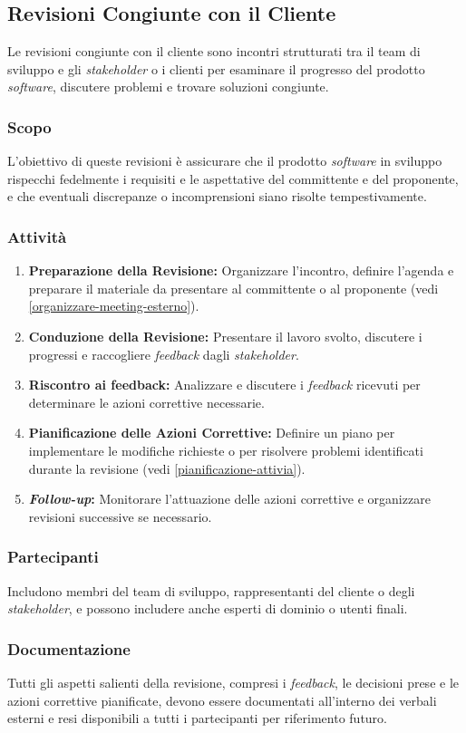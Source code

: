 \subsection{Revisioni Congiunte con il Cliente}

Le revisioni congiunte con il cliente sono incontri strutturati tra il team di
sviluppo e gli \textit{stakeholder} o i clienti per esaminare il progresso del
prodotto \textit{software}, discutere problemi e trovare soluzioni congiunte.

\subsubsection{Scopo}
L'obiettivo di queste revisioni è assicurare che il prodotto \textit{software}
in sviluppo rispecchi fedelmente i requisiti e le aspettative del committente e
del proponente, e che eventuali discrepanze o incomprensioni siano risolte
tempestivamente.

\subsubsection{Attività}
\begin{enumerate}
	\item \textbf{Preparazione della Revisione:} Organizzare l'incontro,
	      definire l'agenda e preparare il materiale da presentare al
	      committente o al proponente (vedi
	      \autoref{organizzare-meeting-esterno}).
	\item \textbf{Conduzione della Revisione:} Presentare il lavoro svolto,
	      discutere i progressi e raccogliere \textit{feedback\g} dagli
	      \textit{stakeholder}.
	\item \textbf{Riscontro ai feedback\g:} Analizzare e discutere i
	      \textit{feedback\g} ricevuti per determinare le azioni correttive
	      necessarie.
	\item \textbf{Pianificazione delle Azioni Correttive:} Definire un piano per
	      implementare le modifiche richieste o per risolvere problemi
	      identificati durante la revisione (vedi
	      \autoref{pianificazione-attivia}).
	\item \textbf{\textit{Follow-up}:} Monitorare l'attuazione delle azioni
	      correttive e organizzare revisioni successive se necessario.
\end{enumerate}

\subsubsection{Partecipanti}
Includono membri del team di sviluppo, rappresentanti del cliente o degli
\textit{stakeholder}, e possono includere anche esperti di dominio o utenti
finali.

\subsubsection{Documentazione}
Tutti gli aspetti salienti della revisione, compresi i \textit{feedback\g}, le
decisioni prese e le azioni correttive pianificate, devono essere documentati
all'interno dei verbali esterni e resi disponibili a tutti i partecipanti per
riferimento futuro.

